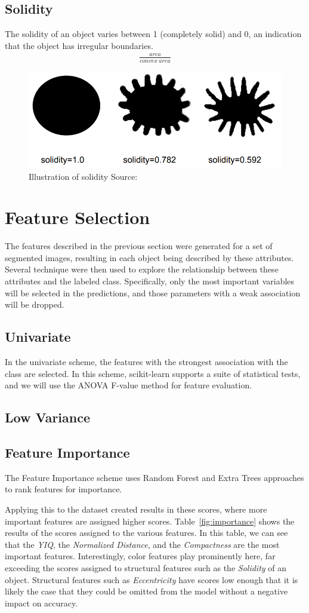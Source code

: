 \documentclass[letterpaper]{article}
\begin{document}
{\subsection{Solidity}
The solidity of an object varies between 1 (completely solid) and 0, an indication that the object has irregular boundaries.
\begin{eqnarray*}
\frac {area} {convex\ area}
\end{eqnarray*}
\begin{figure}[H]
	\centering
	\includegraphics[width=0.4\linewidth]{./figures/solidity.png}
	\caption{Illustration of solidity Source: \cite{Wirth2004-l} }
	\label{fig:circularity}
\end{figure}

\section{Feature Selection}
The features described in the previous section were generated for a set of segmented images, resulting in each object being described by these attributes. Several technique were then used to explore the relationship between these attributes and the labeled class. Specifically, only the most important variables will be selected in the predictions, and those parameters with a weak association will be dropped.
\subsection{Univariate}
In the univariate scheme, the features with the strongest association with the class are selected. In this scheme, scikit-learn supports a suite of statistical tests, and we will use the ANOVA F-value method for feature evaluation.
\subsection{Low Variance}
\subsection{Feature Importance}
The Feature Importance scheme uses Random Forest and Extra Trees approaches to rank features for importance.

Applying this to the dataset created results in these scores, where more important features are assigned higher scores. Table~\ref{fig:importance} shows the results of the scores assigned to the various features.   In this table, we can see that the {\it YIQ}, the {\it Normalized Distance}, and the {\it Compactness} are the most important features. Interestingly, color features play prominently here, far exceeding the scores assigned to structural features such as the {\it Solidity} of an object. Structural features such as {\it Eccentricity} have scores low enough that it is likely the case that they could be omitted from the model without a negative impact on accuracy.

}
\end{document}
